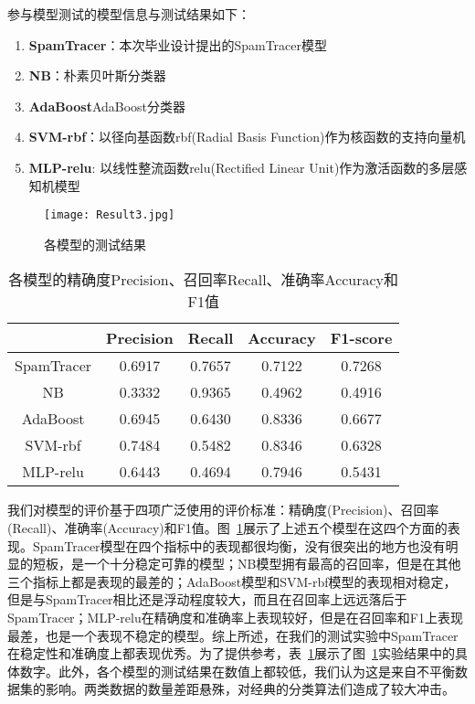 参与模型测试的模型信息与测试结果如下：

\begin{enumerate}	
	\item[(1)] \textbf{SpamTracer}：本次毕业设计提出的SpamTracer模型
	\item[(2)] \textbf{NB}：朴素贝叶斯分类器
	\item[(3)] \textbf{AdaBoost}AdaBoost分类器
	\item[(4)] \textbf{SVM-rbf}：以径向基函数rbf(Radial Basis Function)作为核函数的支持向量机
	\item[(5)] \textbf{MLP-relu}: 以线性整流函数relu(Rectified Linear Unit)作为激活函数的多层感知机模型
\end{enumerate}


\begin{figure}[htbp]
	\centering
	\begin{minipage}[htbp]{0.6\textwidth}
		\centering
		\texttt{[image: Result3.jpg]}
		\caption[各模型的测试结果]
		{各模型的测试结果\label{fig:result}}		
	\end{minipage}     
\end{figure}


\begin{table}[htb]
	\centering
	\caption[各模型的精确度Precision、召回率Recall、准确率Accuracy和F1值]{各模型的精确度Precision、召回率Recall、准确率Accuracy和F1值}
	\label{tbl:Result}
	\begin{tabular}{ccccc}	
		\toprule
		& Precision & Recall & Accuracy & F1-score \\
		\midrule
		SpamTracer & 0.6917  & 0.7657 & 0.7122   &	0.7268 \\
		NB				& 0.3332  &	0.9365 & 0.4962   &	0.4916 \\
		AdaBoost		& 0.6945  &	0.6430 & 0.8336   &	0.6677 \\
		SVM-rbf			& 0.7484  &	0.5482 & 0.8346   &	0.6328 \\
		MLP-relu		& 0.6443  &	0.4694 & 0.7946   &	0.5431 \\
		\bottomrule
	\end{tabular}
\end{table}

我们对模型的评价基于四项广泛使用的评价标准：精确度(Precision)、召回率(Recall)、准确率(Accuracy)和F1值。图~\ref{fig:result}展示了上述五个模型在这四个方面的表现。SpamTracer模型在四个指标中的表现都很均衡，没有很突出的地方也没有明显的短板，是一个十分稳定可靠的模型；NB模型拥有最高的召回率，但是在其他三个指标上都是表现的最差的；AdaBoost模型和SVM-rbf模型的表现相对稳定，但是与SpamTracer相比还是浮动程度较大，而且在召回率上远远落后于SpamTracer；MLP-relu在精确度和准确率上表现较好，但是在召回率和F1上表现最差，也是一个表现不稳定的模型。综上所述，在我们的测试实验中SpamTracer在稳定性和准确度上都表现优秀。为了提供参考，表~\ref{tbl:Result}展示了图~\ref{fig:result}实验结果中的具体数字。此外，各个模型的测试结果在数值上都较低，我们认为这是来自不平衡数据集的影响。两类数据的数量差距悬殊，对经典的分类算法们造成了较大冲击。


